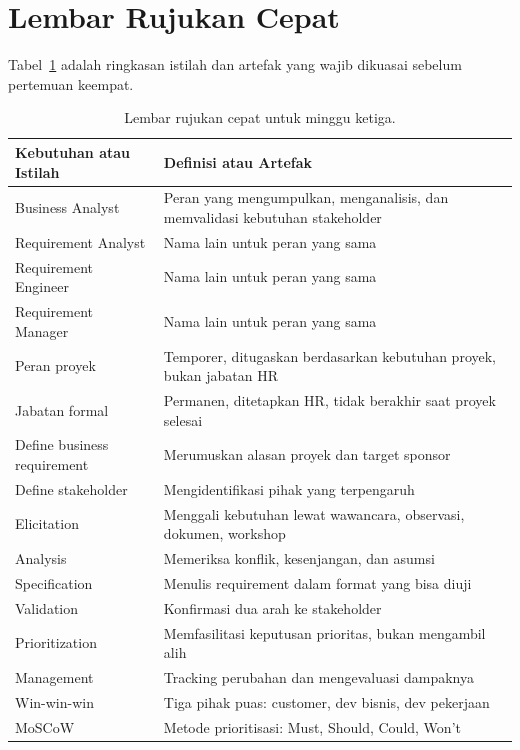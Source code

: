\documentclass[11pt,a4paper]{article}
\begin{document}
\section{Lembar Rujukan Cepat}

Tabel~\ref{tab:cheat} adalah ringkasan istilah dan artefak yang wajib dikuasai sebelum pertemuan keempat.

\begin{table}[H]
	\centering
	\caption{Lembar rujukan cepat untuk minggu ketiga.}
	\label{tab:cheat}
	\footnotesize
	\begin{tabularx}{\textwidth}{l X}
		\toprule
		Kebutuhan atau Istilah      & Definisi atau Artefak                                                        \\
		\midrule
		Business Analyst            & Peran yang mengumpulkan, menganalisis, dan memvalidasi kebutuhan stakeholder \\
		Requirement Analyst         & Nama lain untuk peran yang sama                                              \\
		Requirement Engineer        & Nama lain untuk peran yang sama                                              \\
		Requirement Manager         & Nama lain untuk peran yang sama                                              \\
		Peran proyek                & Temporer, ditugaskan berdasarkan kebutuhan proyek, bukan jabatan HR          \\
		Jabatan formal              & Permanen, ditetapkan HR, tidak berakhir saat proyek selesai                  \\
		Define business requirement & Merumuskan alasan proyek dan target sponsor                                  \\
		Define stakeholder          & Mengidentifikasi pihak yang terpengaruh                                      \\
		Elicitation                 & Menggali kebutuhan lewat wawancara, observasi, dokumen, workshop             \\
		Analysis                    & Memeriksa konflik, kesenjangan, dan asumsi                                   \\
		Specification               & Menulis requirement dalam format yang bisa diuji                             \\
		Validation                  & Konfirmasi dua arah ke stakeholder                                           \\
		Prioritization              & Memfasilitasi keputusan prioritas, bukan mengambil alih                      \\
		Management                  & Tracking perubahan dan mengevaluasi dampaknya                                \\
		Win-win-win                 & Tiga pihak puas: customer, dev bisnis, dev pekerjaan                         \\
		MoSCoW                      & Metode prioritisasi: Must, Should, Could, Won't                              \\
		\bottomrule
	\end{tabularx}
\end{table}
\end{document}
